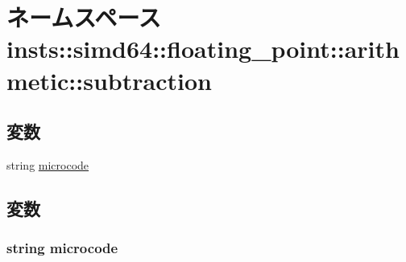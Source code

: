 \hypertarget{namespaceinsts_1_1simd64_1_1floating__point_1_1arithmetic_1_1subtraction}{
\section{ネームスペース insts::simd64::floating\_\-point::arithmetic::subtraction}
\label{namespaceinsts_1_1simd64_1_1floating__point_1_1arithmetic_1_1subtraction}
}
\subsection*{変数}
\begin{DoxyCompactItemize}
\item 
string \hyperlink{namespaceinsts_1_1simd64_1_1floating__point_1_1arithmetic_1_1subtraction_a770f11a173e99389a8802f0107ed8f52}{microcode}
\end{DoxyCompactItemize}


\subsection{変数}
\hypertarget{namespaceinsts_1_1simd64_1_1floating__point_1_1arithmetic_1_1subtraction_a770f11a173e99389a8802f0107ed8f52}{
\subsubsection[{microcode}]{\setlength{\rightskip}{0pt plus 5cm}string {\bf microcode}}}
\label{namespaceinsts_1_1simd64_1_1floating__point_1_1arithmetic_1_1subtraction_a770f11a173e99389a8802f0107ed8f52}
